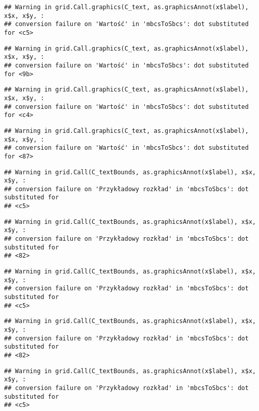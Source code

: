 \documentclass[
]{book}
\begin{document}
\begin{verbatim}
## Warning in grid.Call.graphics(C_text, as.graphicsAnnot(x$label), x$x, x$y, :
## conversion failure on 'Wartość' in 'mbcsToSbcs': dot substituted for <c5>
\end{verbatim}

\begin{verbatim}
## Warning in grid.Call.graphics(C_text, as.graphicsAnnot(x$label), x$x, x$y, :
## conversion failure on 'Wartość' in 'mbcsToSbcs': dot substituted for <9b>
\end{verbatim}

\begin{verbatim}
## Warning in grid.Call.graphics(C_text, as.graphicsAnnot(x$label), x$x, x$y, :
## conversion failure on 'Wartość' in 'mbcsToSbcs': dot substituted for <c4>
\end{verbatim}

\begin{verbatim}
## Warning in grid.Call.graphics(C_text, as.graphicsAnnot(x$label), x$x, x$y, :
## conversion failure on 'Wartość' in 'mbcsToSbcs': dot substituted for <87>
\end{verbatim}

\begin{verbatim}
## Warning in grid.Call(C_textBounds, as.graphicsAnnot(x$label), x$x, x$y, :
## conversion failure on 'Przykładowy rozkład' in 'mbcsToSbcs': dot substituted for
## <c5>
\end{verbatim}

\begin{verbatim}
## Warning in grid.Call(C_textBounds, as.graphicsAnnot(x$label), x$x, x$y, :
## conversion failure on 'Przykładowy rozkład' in 'mbcsToSbcs': dot substituted for
## <82>
\end{verbatim}

\begin{verbatim}
## Warning in grid.Call(C_textBounds, as.graphicsAnnot(x$label), x$x, x$y, :
## conversion failure on 'Przykładowy rozkład' in 'mbcsToSbcs': dot substituted for
## <c5>
\end{verbatim}

\begin{verbatim}
## Warning in grid.Call(C_textBounds, as.graphicsAnnot(x$label), x$x, x$y, :
## conversion failure on 'Przykładowy rozkład' in 'mbcsToSbcs': dot substituted for
## <82>
\end{verbatim}

\begin{verbatim}
## Warning in grid.Call(C_textBounds, as.graphicsAnnot(x$label), x$x, x$y, :
## conversion failure on 'Przykładowy rozkład' in 'mbcsToSbcs': dot substituted for
## <c5>
\end{verbatim}
\end{document}
